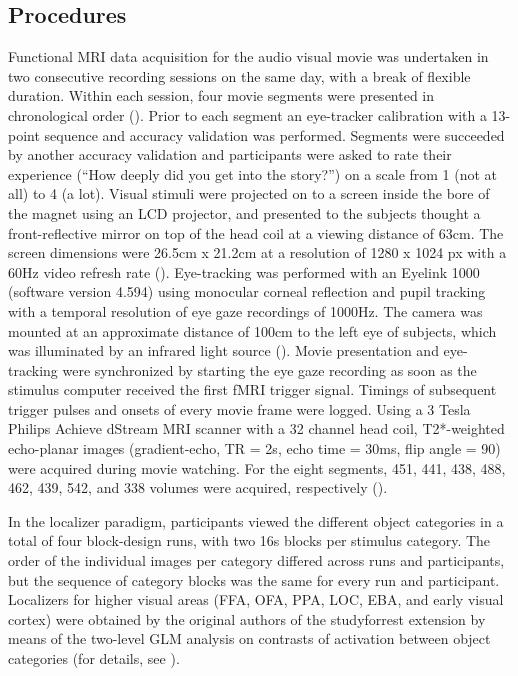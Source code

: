 \documentclass[a4paper, 12pt]{scrreprt}
\begin{document}
\subsection{Procedures}
Functional MRI data acquisition for the audio visual movie was undertaken in two consecutive recording sessions on the same day, with a break of flexible duration. Within each session, four movie segments were presented in chronological order (\cite{hanke2016studyforrest}).  Prior to each segment an eye-tracker calibration with a 13-point sequence and accuracy validation was performed.
Segments were succeeded by another accuracy validation and participants were asked to rate their experience (“How deeply did you get into the story?”) on a scale from 1 (not at all) to 4 (a lot). Visual stimuli were projected on to a screen inside the bore of the magnet using an LCD projector, and presented to the subjects thought a front-reflective mirror on top of the head
coil at a viewing distance of 63cm. The screen dimensions were 26.5cm x 21.2cm at a resolution of 1280 x 1024 px with a 60Hz video refresh rate (\cite{sengupta2016studyforrest}). Eye-tracking was performed with an Eyelink 1000 (software version 4.594) using monocular corneal reflection and pupil tracking with a temporal resolution of eye gaze recordings of 1000Hz. The camera was mounted at an approximate distance of 100cm to the left eye of subjects, which was illuminated
by an infrared light source (\cite{hanke2016studyforrest}). Movie presentation and eye-tracking were synchronized by starting the eye gaze recording as soon as the stimulus computer received the first fMRI trigger signal. Timings of subsequent trigger pulses and onsets of every movie frame
were logged. Using a 3 Tesla Philips Achieve dStream MRI scanner with a 32 channel head coil, T2*-weighted echo-planar images (gradient-echo, TR = 2s, echo time = 30ms, flip angle = 90) were acquired during movie watching. For the eight segments, 451, 441, 438, 488, 462, 439, 542, and 338 volumes were acquired, respectively (\cite{hanke2016studyforrest}).\newline

In the localizer paradigm, participants viewed the different object categories in a total of four block-design runs, with two 16s blocks per stimulus category. The order of the individual images per category differed across runs and participants, but the sequence of category blocks was the same for every run and participant. Localizers for higher visual areas (FFA, OFA, PPA, LOC, EBA, and early visual cortex) were obtained by the original authors of the studyforrest extension by means of the two-level GLM analysis on contrasts of activation between object categories (for details, see \cite{sengupta2016studyforrest}).
\end{document}
